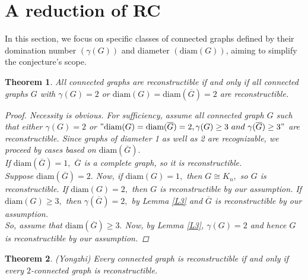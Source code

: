 \documentclass[11pt,oneside]{article}
\newtheorem{thm}{Theorem}
\theoremstyle{definition}
\begin{document}
\section{A reduction of RC}
\indent \indent In this section, we focus on specific classes of connected graphs defined by their domination number $(\gamma(G))$ and diameter $(\text{diam}(G))$, aiming to simplify the conjecture's scope.


\begin{thm}\label{21}
All connected graphs are reconstructible if and only if all connected graphs $G$ with  $\gamma(G)=2$ or 
$\text{diam}(G)=\text{diam}(\overline{G})=2$ are reconstructible.
       
     
\begin{proof}
Necessity  is obvious. For sufficiency, assume  all connected graph $G$ such that either $\gamma(G)=2$ or $"\text{diam}(G)=\text{diam}(\overline{G})=2, \gamma(G) \geq 3 ~ and ~ \gamma(\overline{G}) \geq 3"$ are reconstructible. Since graphs of diameter 1 as well as  2  are recognizable, we proceed by cases based on $\text{diam}(\overline{G}).$ \\
 If $\text{diam}(\overline{G})=1,$ $\overline{G}$ is a complete graph, so it is reconstructible. \\ Suppose $\text{diam}(\overline{G})=2.$ Now, if $\text{diam}(G)=1,$ then $G \cong K_n,$  so $G$ is reconstructible. If $\text{diam}(G)=2,$ then $G$ is reconstructible by our assumption. If $\text{diam}(G) \geq 3,$ then $\gamma(\overline{G})=2,$ by Lemma \ref{L3} and $\overline{G}$ is reconstructible by our assumption. \\ So, assume that $\text{diam}(\overline{G}) \geq 3.$
 Now, by Lemma \ref{L3},  $\gamma(G)=2$ and hence $G$ is reconstructible by our assumption.
\end{proof} 
\end{thm}
  
\begin{thm}(Yongzhi\cite{y}) \label{22}
Every connected graph is reconstructible if and only if every $2$-connected graph is reconstructible.
\end{thm} 
\end{document}
